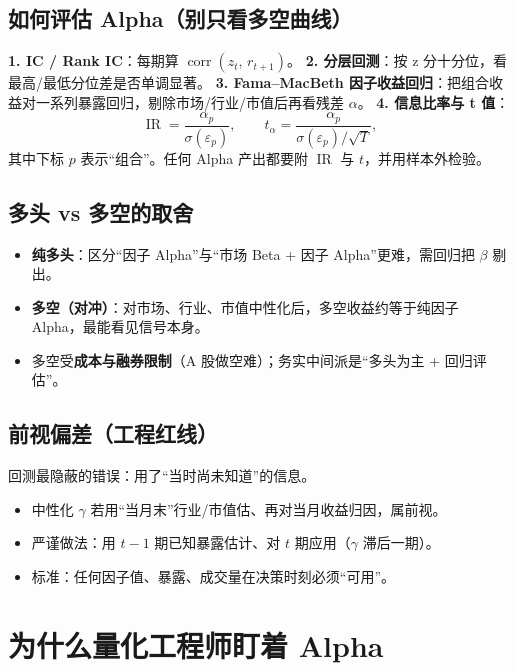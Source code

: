 \documentclass[UTF8,11pt]{ctexart}
\begin{document}
\subsection{如何评估 Alpha（别只看多空曲线）}
\textbf{1. IC / Rank IC}：每期算 $\operatorname{corr}(z_t,\,r_{t+1})$。
\textbf{2. 分层回测}：按 z 分十分位，看最高/最低分位差是否单调显著。
\textbf{3. Fama--MacBeth 因子收益回归}：把组合收益对一系列暴露回归，剔除市场/行业/市值后再看残差 $\alpha$。
\textbf{4. 信息比率与 t 值}：
\begin{equation}
\operatorname{IR}=\frac{\alpha_p}{\sigma(\varepsilon_p)},\qquad
t_\alpha=\frac{\alpha_p}{\sigma(\varepsilon_p)/\sqrt{T}},
\end{equation}
其中下标 $p$ 表示“组合”。任何 Alpha 产出都要附 $\operatorname{IR}$ 与 $t$，并用样本外检验。

\subsection{多头 vs 多空的取舍}
\begin{itemize}[itemsep=2pt]
\item \textbf{纯多头}：区分“因子 Alpha”与“市场 Beta + 因子 Alpha”更难，需回归把 $\beta$ 剔出。
\item \textbf{多空（对冲）}：对市场、行业、市值中性化后，多空收益约等于纯因子 Alpha，最能看见信号本身。
\item 多空受\textbf{成本与融券限制}（A 股做空难）；务实中间派是“多头为主 + 回归评估”。
\end{itemize}

\subsection{前视偏差（工程红线）}
回测最隐蔽的错误：用了“当时尚未知道”的信息。
\begin{itemize}[itemsep=2pt]
\item 中性化 $\gamma$ 若用“当月末”行业/市值估、再对当月收益归因，属前视。
\item 严谨做法：用 $t-1$ 期已知暴露估计、对 $t$ 期应用（$\gamma$ 滞后一期）。
\item 标准：任何因子值、暴露、成交量在决策时刻必须“可用”。
\end{itemize}

\section{为什么量化工程师盯着 Alpha}
\end{document}
